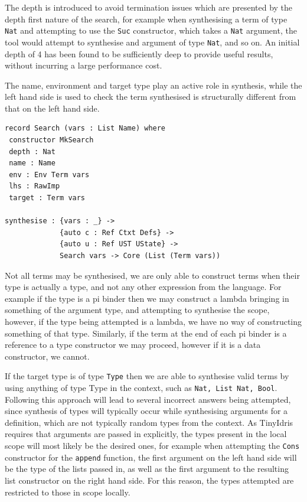 \documentclass[a4paper]{article}
\begin{document}
The depth is introduced to avoid termination issues which are presented by the depth first nature of the search, for
example when synthesising a term of type \texttt{Nat} and attempting to use the \texttt{Suc} constructor, which takes a \texttt{Nat} argument, the tool would attempt to synthesise and argument of type \texttt{Nat}, and so on.
An initial depth of 4 has been found to be sufficiently deep to provide useful results, without incurring a large
performance cost. 

The name, environment and target type play an active role in synthesis, while the left hand side is used to check the term 
synthesised is structurally different from that on the left hand side. 

\begin{center}
\begin{verbatim}
record Search (vars : List Name) where
 constructor MkSearch
 depth : Nat
 name : Name
 env : Env Term vars
 lhs : RawImp
 target : Term vars 

synthesise : {vars : _} -> 
			 {auto c : Ref Ctxt Defs} -> 
			 {auto u : Ref UST UState} ->
			 Search vars -> Core (List (Term vars))

\end{verbatim}
\end{center}


Not all terms may be synthesised, we are only able to construct terms when their type is actually a type, and not any
other expression from the language. For example if the type is a pi binder then we
may construct a lambda bringing in something of the argument type, and attempting to
synthesise the scope, however, if the type being attempted is a lambda, we
have no way of constructing something of that type. Similarly, if the
term at the end of each pi binder is a reference to a type constructor
we may proceed, however if it is a data constructor, we cannot. 

If the target type is of type \texttt{Type} then we are able to synthesise
valid terms by using anything of type Type in the context, such as
\texttt{Nat, List Nat, Bool}. Following this approach will lead to several
incorrect answers being attempted, since synthesis of types will
typically occur while synthesising arguments for a definition, which
are not typically random types from the context. As TinyIdris
requires that arguments are passed in explicitly, the types present in
the local scope will most likely be the desired ones, for example
when attempting the \texttt{Cons} constructor for the \texttt{append}
function, the first argument on the left hand side will be the type
of the lists passed in, as well as the first argument to the resulting
list constructor on the right hand side. For this reason, the types
attempted are restricted to those in scope locally.
\end{document}
